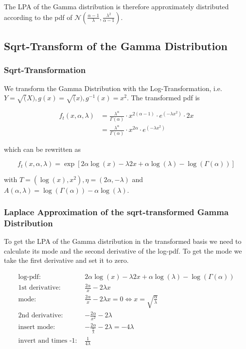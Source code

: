 The LPA of the Gamma distribution is therefore approximately distributed according to the pdf of $\mathcal{N}(\frac{\alpha - 1}{\lambda}, \frac{\lambda^2}{\alpha-1})$.

\subsection{Sqrt-Transform of the Gamma Distribution}

\subsubsection{Sqrt-Transformation}

We transform the Gamma Distribution with the Log-Transformation, i.e. $Y = \sqrt(X), g(x) = \sqrt(x), g^{-1}(x) = x^2$. The transformed pdf is

\begin{align}
f_t(x, \alpha, \lambda) &= \frac{\lambda^\alpha}{\Gamma(\alpha)} \cdot x^{2(\alpha - 1)} \cdot e^{(-\lambda x^2)} \cdot 2x \\ \nonumber
&=\frac{\lambda^\alpha}{\Gamma(\alpha)} \cdot x^{2\alpha} \cdot e^{(-\lambda x^2)}
\end{align}

which can be rewritten as

\begin{equation}
f_t(x, \alpha, \lambda) = \exp \left[2\alpha \log(x) - \lambda 2x + \alpha \log(\lambda) - \log(\Gamma(\alpha))\right]	
\label{eq:square_gamma_trans}
\end{equation}

with $T = (\log(x), x^2), \eta = (2\alpha, -\lambda)$ and $A(\alpha, \lambda) = \log(\Gamma(\alpha)) - \alpha  \log(\lambda)$. 


\subsubsection{Laplace Approximation of the sqrt-transformed Gamma Distribution}

To get the LPA of the Gamma distribution in the transformed basis we need to calculate its mode and the second derivative of the log-pdf. To get the mode we take the first derivative and set it to zero. 

\begin{align*}
\text{log-pdf: } &2\alpha \log(x) - \lambda 2x + \alpha \log(\lambda) - \log(\Gamma(\alpha)) \\
\text{1st derivative: }&  \frac{2\alpha}{x} - 2\lambda x\\
\text{mode: }& \frac{2\alpha}{x} - 2\lambda x = 0 \Leftrightarrow x = \sqrt{\frac{\alpha}{\lambda}}\\
\text{2nd derivative: }&  -\frac{2\alpha}{x^2} - 2\lambda\\
\text{insert mode: }& -\frac{2\alpha}{\frac{\alpha}{\lambda}} - 2\lambda = -4\lambda\\
\text{invert and times -1: }& \frac{1}{4\lambda}
\end{align*}

